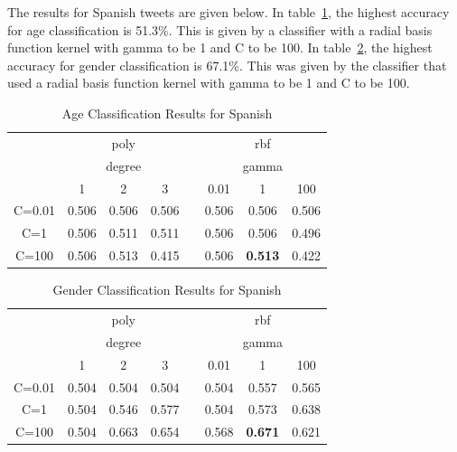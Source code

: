 \documentclass[conference]{IEEEtran}
\begin{document}
The results for Spanish tweets are given below. In table~\ref{SpanishAge}, the highest accuracy for age classification is 51.3\%. This is given by a classifier with a radial basis function kernel with gamma to be 1 and C to be 100. In table~\ref{SpanishGender}, the highest accuracy for gender classification is 67.1\%. This was given by the classifier that used a radial basis function kernel with gamma to be 1 and C to be 100. 
\begin{table}[!htbp]
\centering
\caption{Age Classification Results for Spanish}
\label{SpanishAge}
\setlength{\tabcolsep}{0.5em}
{\renewcommand{\arraystretch}{1.2}%
\begin{tabular}{cccccccc}
\toprule
     & \multicolumn{3}{c}{poly}   &  & \multicolumn{3}{c}{rbf}        \\
     & \multicolumn{3}{c}{degree} &  & \multicolumn{3}{c}{gamma}      \\
    & 1       & 2       & 3      &  & 0.01  & 1              & 100   \\
\midrule
C=0.01 & 0.506   & 0.506   & 0.506  &  & 0.506 & 0.506          & 0.506 \\
C=1    & 0.506   & 0.511   & 0.511  &  & 0.506 & 0.506          & 0.496 \\
C=100  & 0.506   & 0.513   & 0.415  &  & 0.506 & \textbf{0.513} & 0.422 \\
\bottomrule
\end{tabular}
}
\end{table}

\begin{table}[!htbp]
\centering
\caption{Gender Classification Results for Spanish}
\label{SpanishGender}
\setlength{\tabcolsep}{0.5em}
{\renewcommand{\arraystretch}{1.2}%
\begin{tabular}{cccccccc}
\toprule
     & \multicolumn{3}{c}{poly}   &  & \multicolumn{3}{c}{rbf}        \\
     & \multicolumn{3}{c}{degree} &  & \multicolumn{3}{c}{gamma}      \\
    & 1       & 2       & 3      &  & 0.01  & 1              & 100   \\
\midrule
C=0.01 & 0.504   & 0.504   & 0.504  &  & 0.504 & 0.557          & 0.565 \\
C=1    & 0.504   & 0.546   & 0.577  &  & 0.504 & 0.573          & 0.638 \\
C=100  & 0.504   & 0.663   & 0.654  &  & 0.568 & \textbf{0.671} & 0.621 \\
\bottomrule
\end{tabular}
}
\end{table}
\end{document}

